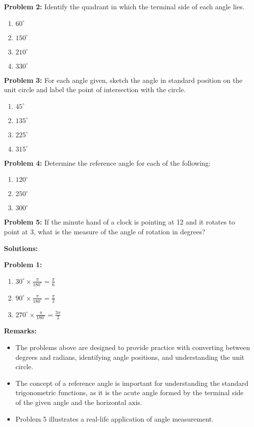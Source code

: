 \documentclass[a4paper,12pt]{book}
\begin{document}
\textbf{Problem 2:} Identify the quadrant in which the terminal side of each angle lies.
\begin{enumerate}[label=\alph*.]
  \item \( 60^\circ \)
  \item \( 150^\circ \)
  \item \( 210^\circ \)
  \item \( 330^\circ \)
\end{enumerate}

\textbf{Problem 3:} For each angle given, sketch the angle in standard position on the unit circle and label the point of intersection with the circle.
\begin{enumerate}[label=\alph*.]
  \item \( 45^\circ \)
  \item \( 135^\circ \)
  \item \( 225^\circ \)
  \item \( 315^\circ \)
\end{enumerate}

\textbf{Problem 4:} Determine the reference angle for each of the following:
\begin{enumerate}[label=\alph*.]
  \item \( 120^\circ \)
  \item \( 250^\circ \)
  \item \( 300^\circ \)
\end{enumerate}

\textbf{Problem 5:} If the minute hand of a clock is pointing at 12 and it rotates to point at 3, what is the measure of the angle of rotation in degrees?

\textbf{Solutions:}

\textbf{Problem 1:}
\begin{enumerate}[label=\alph*.]
  \item \( 30^\circ \times \frac{\pi}{180^\circ} = \frac{\pi}{6} \)
  \item \( 90^\circ \times \frac{\pi}{180^\circ} = \frac{\pi}{2} \)
  \item \( 270^\circ \times \frac{\pi}{180^\circ} = \frac{3\pi}{2} \)
\end{enumerate}


\textbf{Remarks:}
\begin{itemize}
  \item The problems above are designed to provide practice with converting between degrees and radians, identifying angle positions, and understanding the unit circle.
  \item The concept of a reference angle is important for understanding the standard trigonometric functions, as it is the acute angle formed by the terminal side of the given angle and the horizontal axis.
  \item Problem 5 illustrates a real-life application of angle measurement.
\end{itemize}
\end{document}
